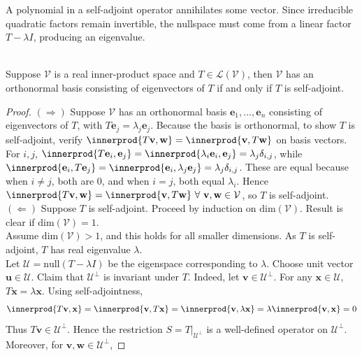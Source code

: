 A polynomial in a self-adjoint operator annihilates some vector. Since irreducible quadratic factors remain invertible, the nullspace must come from a linear factor $T - \lambda I$, producing an eigenvalue.

\begin{theorem} \label{thm:realspectralthm} \\
Suppose $\mathcal{V}$ is a real inner-product space and $T \in \mathcal{L}(\mathcal{V})$, then $\mathcal{V}$ has an orthonormal basis consisting of eigenvectors of $T$ if and only if $T$ is self-adjoint.
\begin{proof} $(\Rightarrow)$ Suppose $\mathcal{V}$ has an orthonormal basis $\mathbf{e}_1, \ldots, \mathbf{e}_n$ consisting of eigenvectors of $T$, with $T \mathbf{e}_j = \lambda_j \mathbf{e}_j$. Because the basis is orthonormal, to show $T$ is self-adjoint, verify $\innerprod{T \mathbf{v}, \mathbf{w}} = \innerprod{\mathbf{v}, T \mathbf{w}}$ on basis vectors.\\
For $i, j$, $\innerprod{T \mathbf{e}_i, \mathbf{e}_j} = \innerprod{\lambda_i \mathbf{e}_i, \mathbf{e}_j} = \lambda_j \delta_{i,j}$, while $\innerprod{\mathbf{e}_i, T \mathbf{e}_j} = \innerprod{\mathbf{e}_i, \lambda_j \mathbf{e}_j} = \lambda_j \delta_{i,j}$. These are equal because when $i \neq j$, both are $0$, and when $i=j$, both equal $\lambda_i$. Hence $\innerprod{T \mathbf{v}, \mathbf{w}} = \innerprod{\mathbf{v}, T \mathbf{w}} \ \forall \ \mathbf{v}, \mathbf{w} \in \mathcal{V}$, so $T$ is self-adjoint.
$(\Leftarrow)$ Suppose $T$ is self-adjoint. Proceed by induction on $\text{dim}(\mathcal{V})$. Result is clear if $\text{dim}(\mathcal{V}) = 1$.\\
Assume $\text{dim}(\mathcal{V}) > 1$, and this holds for all smaller dimensions. As $T$ is self-adjoint, $T$ has real eigenvalue $\lambda$.\\
Let $\mathcal{U} = \text{null}(T - \lambda I)$ be the eigenspace corresponding to $\lambda$. Choose unit vector $\mathbf{u} \in \mathcal{U}$. Claim that $\mathcal{U}^{\perp}$ is invariant under $T$. Indeed, let $\mathbf{v} \in \mathcal{U}^{\perp}$. For any $\mathbf{x} \in \mathcal{U}$, $T \mathbf{x} = \lambda \mathbf{x}$. Using self-adjointness,
\begin{align}
\innerprod{T \mathbf{v}, \mathbf{x}} = \innerprod{\mathbf{v}, T \mathbf{x}} = \innerprod{\mathbf{v}, \lambda \mathbf{x}} = \lambda \innerprod{\mathbf{v}, \mathbf{x}} = 0 \nonumber
\end{align} 
Thus $T \mathbf{v} \in \mathcal{U}^{\perp}$. Hence the restriction $S = T|_{\mathcal{U}^{\perp}}$ is a well-defined operator on $\mathcal{U}^{\perp}$. Moreover, for $\mathbf{v}, \mathbf{w} \in \mathcal{U}^{\perp}$, 

\end{proof}
\end{theorem}
